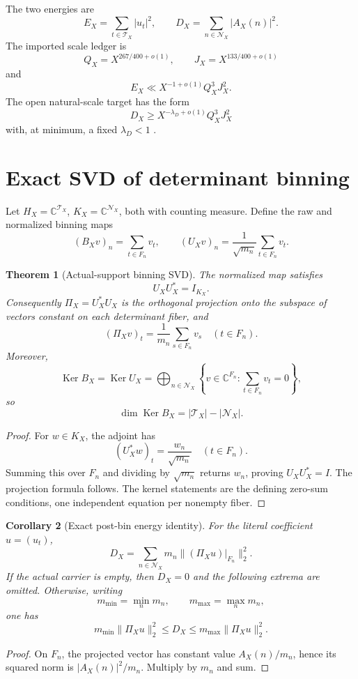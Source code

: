 \documentclass[11pt,a4paper]{article}
\newtheorem{theorem}{Theorem}[section]
\newtheorem{corollary}[theorem]{Corollary}
\theoremstyle{definition}
\theoremstyle{remark}
\newcommand{\C}{\mathbb C}
\newcommand{\cT}{\mathcal T}
\newcommand{\cN}{\mathcal N}
\newcommand{\Ker}{\operatorname{Ker}}
\begin{document}
The two energies are
\[
 E_X=\sum_{t\in\cT_X}|u_t|^2,\qquad
 D_X=\sum_{n\in\cN_X}|A_X(n)|^2.
\]
The imported scale ledger is
\[
 Q_X=X^{267/400+o(1)},\qquad
 J_X=X^{133/400+o(1)}
\]
and
\[
 E_X\ll X^{-1+o(1)}Q_X^3J_X^2.
\]
The open natural-scale target has the form
\[
 D_X\ge X^{-\lambda_D+o(1)}Q_X^3J_X^2
\]
with, at minimum, a fixed \(\lambda_D<1\)
\citep{WangTPC81,WangTPC82,WangTPC102}.

\section{Exact SVD of determinant binning}

Let \(H_X=\C^{\cT_X}\), \(K_X=\C^{\cN_X}\), both with counting
measure.  Define the raw and normalized binning maps
\[
 (B_Xv)_n=\sum_{t\in F_n}v_t,\qquad
 (U_Xv)_n=\frac1{\sqrt{m_n}}\sum_{t\in F_n}v_t.
\]

\begin{theorem}[Actual-support binning SVD]
\label{thm:svd}
The normalized map satisfies
\[
 U_XU_X^*=I_{K_X}.
\]
Consequently \(\Pi_X=U_X^*U_X\) is the orthogonal projection onto
the subspace of vectors constant on each determinant fiber, and
\[
 (\Pi_Xv)_t=\frac1{m_n}\sum_{s\in F_n}v_s
 \quad(t\in F_n).
\]
Moreover,
\[
 \Ker B_X=\Ker U_X
 =\bigoplus_{n\in\cN_X}
 \left\{v\in\C^{F_n}:\sum_{t\in F_n}v_t=0\right\},
\]
so
\[
 \dim\Ker B_X=|\cT_X|-|\cN_X|.
\]
\end{theorem}

\begin{proof}
For \(w\in K_X\), the adjoint has
\[
 (U_X^*w)_t=\frac{w_n}{\sqrt{m_n}}
 \quad(t\in F_n).
\]
Summing this over \(F_n\) and dividing by \(\sqrt{m_n}\) returns
\(w_n\), proving \(U_XU_X^*=I\).  The projection formula follows.
The kernel statements are the defining zero-sum conditions, one
independent equation per nonempty fiber.
\end{proof}

\begin{corollary}[Exact post-bin energy identity]
\label{cor:energy}
For the literal coefficient \(u=(u_t)\),
\[
 \boxed{
 D_X
 =\sum_{n\in\cN_X}
 m_n\|(\Pi_Xu)|_{F_n}\|_2^2.}
\]
If the actual carrier is empty, then \(D_X=0\) and the following
extrema are omitted.  Otherwise, writing
\[
 m_{\min}=\min_nm_n,\qquad
 m_{\max}=\max_nm_n,
\]
one has
\[
 m_{\min}\|\Pi_Xu\|_2^2
 \le D_X\le
 m_{\max}\|\Pi_Xu\|_2^2.
\]
\end{corollary}

\begin{proof}
On \(F_n\), the projected vector has constant value
\(A_X(n)/m_n\), hence its squared norm is
\(|A_X(n)|^2/m_n\).  Multiply by \(m_n\) and sum.
\end{proof}
\end{document}
